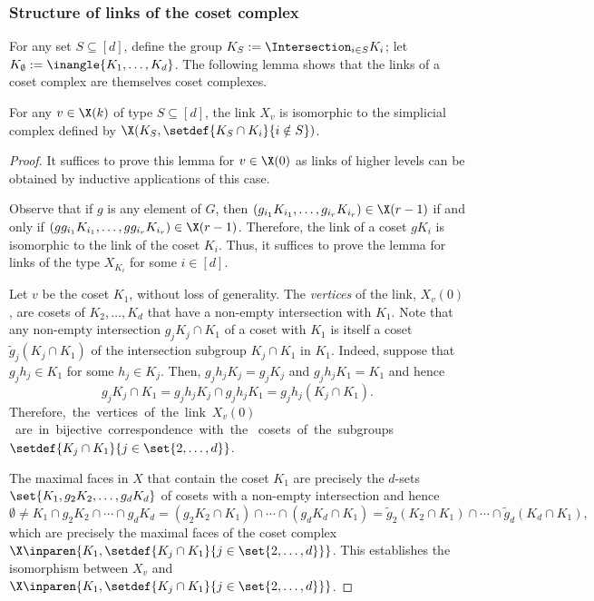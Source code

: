\documentclass{toc}
\begin{document}
\subsubsection*{Structure of links of the coset complex}  %


For any set $S \subseteq [d]$, define the group $K_S :=
\Intersection_{i\in S} K_i$; let $K_\emptyset := \inangle{K_1,\ldots,
  K_d}$. The following lemma shows that the links of a coset complex
are themselves coset complexes. 

\begin{lemma}\label{lem:link-structure}
  For any $v\in \X(k)$ of type $S \subseteq [d]$, the link $X_v$ is isomorphic to the simplicial complex defined by $\X(K_S, \setdef{K_{S} \cap K_i}{i\notin S})$. 
\end{lemma}
\begin{proof}
  It suffices to prove this lemma for $v \in \X(0)$ as links of higher levels can be obtained by inductive applications of this case.

Observe that if $g$ is any element of  $G$, then
  $(g_{i_1} K_{i_1}, \ldots, g_{i_r} K_{i_r}) \in \X(r-1)$ if and only
  if $(g g_{i_1} K_{i_1}, \ldots, g g_{i_r} K_{i_r}) \in \X(r-1)$.
  Therefore, the link of a coset $g K_i$ is isomorphic to the link of
  the coset $K_i$. Thus, it suffices to prove the lemma for links of
  the type $X_{K_i}$ for some $i \in [d]$. 

  Let $v$ be the coset $K_1$, without loss of generality.
  The \emph{vertices} of the link, $X_v(0)$, are cosets of $K_2,\ldots, K_d$ that have a non-empty intersection with $K_1$.
  Note that any non-empty intersection $g_j K_j \cap K_1$ of a coset with $K_1$ is itself a coset $\tilde{g}_j (K_j \cap K_1)$ of the intersection subgroup $K_j \cap K_1$ in $K_1$. Indeed, suppose that $g_j h_j \in K_1$ for some $h_j \in K_j$. Then, $g_j h_j K_j = g_j K_j$ and $g_j h_j K_1 = K_1$ and hence
  \[
    g_j K_j \cap K_1 = g_j h_j K_j \cap g_j h_j K_1 = g_j h_j (K_j \cap K_1).
  \]
%
%
%
%
Therefore,\ the\ vertices\ of\ the\ link\ $X_v(0)$\ are\ in\ bijective\
correspondence\ with\
the\ %
%
cosets\ of\
the\ subgroups\ %
%
$\setdef{K_j \cap K_1}{j \in \set{2,\ldots, d}}$.

  The maximal faces in $X$ that contain the coset $K_1$ are precisely
the %
$d$-sets %
%
$\set{K_1, g_2 K_2, \ldots, g_d K_d}$
of cosets %
%
%
with a non-empty intersection and hence
  \[
    \emptyset \neq K_1 \cap g_2 K_2 \cap  \cdots \cap g_d K_d = (g_2 K_2 \cap K_1) \cap \cdots \cap (g_d K_d \cap K_1) = \tilde{g}_2 (K_2 \cap K_1) \cap \cdots \cap \tilde{g}_d (K_d \cap K_1),
  \]
  which are  precisely the maximal faces of the coset complex
  $\X\inparen{K_1,\setdef{K_j \cap K_1}{j \in \set{2,\ldots,
        d}}}$.  This establishes the isomorphism between $X_v$ and $\X\inparen{K_1,\setdef{K_j \cap K_1}{j \in \set{2,\ldots,
        d}}}$.
\end{proof}
\end{document}
